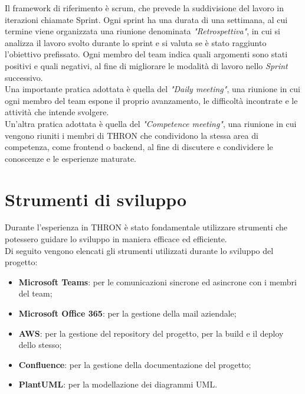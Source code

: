 Il \glsfirstoccur\gls{framework} di riferimento è \glsfirstoccur\gls{scrum}, che prevede la suddivisione del
lavoro in iterazioni chiamate \glsfirstoccur\gls{Sprint}. Ogni sprint ha una durata di una
settimana, al cui termine viene organizzata una riunione denominata
\emph{"Retrospettiva"}, in cui si analizza il lavoro svolto durante lo sprint
e si valuta se è stato raggiunto l'obiettivo prefissato. Ogni
membro del team indica quali argomenti sono stati positivi e quali
negativi, al fine di migliorare le modalità di lavoro nello
\emph{Sprint} successivo.\\
Una importante pratica adottata è quella del \emph{"Daily
      meeting"}, una riunione in cui ogni membro del team espone il proprio
avanzamento, le difficoltà incontrate e le attività che intende svolgere. \\
Un'altra pratica adottata è quella del \emph{"Competence meeting"}, una riunione
in cui vengono riuniti i membri di THRON che condividono la stessa area di
competenza, come \glsfirstoccur\gls{frontend} o \glsfirstoccur\gls{backend}, al
fine di discutere e condividere le conoscenze e le esperienze maturate. \cite{agile-manifesto}\\

\section{Strumenti di sviluppo}
Durante l'esperienza in THRON è stato fondamentale utilizzare strumenti che
potessero guidare lo sviluppo in maniera efficace ed efficiente.\\
Di seguito vengono elencati gli strumenti utilizzati durante lo sviluppo del
progetto:
\begin{itemize}
      \item \textbf{Microsoft Teams}: per le comunicazioni sincrone ed asincrone
            con i membri del team;
      \item \textbf{Microsoft Office 365}: per la gestione della mail aziendale;
      \item \textbf{\glsfirstoccur\gls{AWS}}: per la gestione del \glsfirstoccur\gls{repository} del
            progetto, per la \glsfirstoccur\gls{build} e il \glsfirstoccur\gls{deploy}
            dello stesso;
      \item \textbf{Confluence}: per la gestione della documentazione del progetto;
      \item \textbf{PlantUML}: per la modellazione dei diagrammi \glsfirstoccur\gls{UML}.
\end{itemize}

